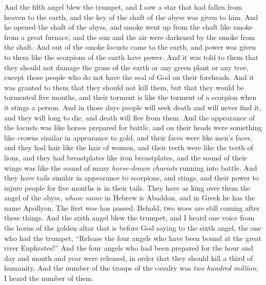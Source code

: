 \begin{biblechapter} %
 And the fifth angel blew the trumpet, and I saw a star that had fallen from heaven to the earth, and the key of the shaft of the abyss was given to him.
\verse And he opened the shaft of the abyss, and smoke went up from the shaft like smoke from a great furnace, and the sun and the air were darkened by the smoke from the shaft.
\verse And out of the smoke locusts came to the earth, and power was given to them like the scorpions of the earth have power.
\verse And it was told to them that they should not damage the grass of the earth or any green plant or any tree, except those people who do not have the seal of God on their foreheads.
\verse And it was granted to them that they should not kill them, but that they would be tormented five months, and their torment is like the torment of a scorpion when it stings a person.
\verse And in those days people will seek death and will never find it, and they will long to die, and death will flee from them.
\verse And the appearance of the locusts was like horses prepared for battle, and on their heads were something like crowns similar in appearance to gold, and their faces were like men’s faces,
\verse and they had hair like the hair of women, and their teeth were like the teeth of lions,
\verse and they had breastplates like iron breastplates, and the sound of their wings was like the sound of many \textit{horse-drawn chariots} running into battle.
\verse And they have tails similar in appearance to scorpions, and stings, and their power to injure people for five months is in their tails.
\verse They have as king over them the angel of the abyss, \textit{whose name} in Hebrew is Abaddon, and in Greek he has the name Apollyon.
\verse The first woe has passed. Behold, two woes are still coming after these things.
 And the sixth angel blew the trumpet, and I heard one voice from the horns of the golden altar that is before God
\verse saying to the sixth angel, the one who had the trumpet, “Release the four angels who have been bound at the great river Euphrates!”
\verse And the four angels who had been prepared for the hour and day and month and year were released, in order that they should kill a third of humanity.
\verse And the number of the troops of the cavalry was \textit{two hundred million}; I heard the number of them.

\end{biblechapter}
